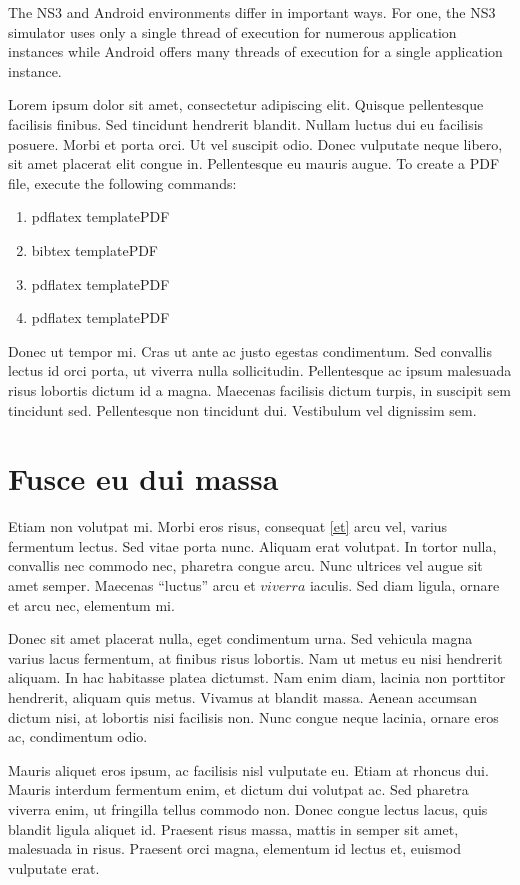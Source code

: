 \documentclass[10pt,twocolumn]{article}
\begin{document}
The NS3 and Android environments differ in important ways. For one, the NS3 simulator uses only a single thread of execution for numerous application instances while Android offers many threads of execution for a single application instance. 


Lorem ipsum dolor sit amet, consectetur adipiscing elit. Quisque pellentesque facilisis finibus. Sed tincidunt hendrerit blandit. Nullam luctus dui eu facilisis posuere. Morbi et porta orci. Ut vel suscipit odio. Donec vulputate neque libero, sit amet placerat elit congue in. Pellentesque eu mauris augue.
\noindent
To create a PDF file, execute the following commands:
\begin{enumerate}
\item pdflatex templatePDF
\item bibtex templatePDF
\item pdflatex templatePDF
\item pdflatex templatePDF
\end{enumerate}
\noindent
Donec ut tempor mi. Cras ut ante ac justo egestas condimentum. Sed convallis lectus id orci porta, ut viverra nulla sollicitudin. Pellentesque ac ipsum malesuada risus lobortis dictum id a magna. Maecenas facilisis dictum turpis, in suscipit sem tincidunt sed. Pellentesque non tincidunt dui. Vestibulum vel dignissim sem.

\section{Fusce eu dui massa}

Etiam non volutpat mi. Morbi eros risus, consequat \ref{et} arcu vel, varius fermentum lectus. Sed vitae porta nunc. Aliquam erat volutpat. In tortor nulla, convallis nec commodo nec, pharetra congue arcu. Nunc ultrices vel augue sit amet semper. Maecenas ``luctus'' arcu et $viverra$ iaculis. Sed diam ligula, ornare et arcu nec, elementum \cite{convallis} mi.

Donec sit amet placerat nulla, eget condimentum urna. Sed vehicula magna varius lacus fermentum, at finibus risus lobortis. Nam ut metus eu nisi hendrerit aliquam. In hac habitasse platea dictumst. Nam enim diam, lacinia non porttitor hendrerit, aliquam quis metus. Vivamus at blandit massa. Aenean accumsan dictum nisi, at lobortis nisi facilisis non. Nunc congue neque lacinia, ornare eros ac, condimentum odio.

Mauris aliquet eros ipsum, ac facilisis nisl vulputate eu. Etiam at rhoncus dui. Mauris interdum fermentum enim, et dictum dui volutpat ac. Sed pharetra viverra enim, ut fringilla tellus commodo non. Donec congue lectus lacus, quis blandit ligula aliquet id. Praesent risus massa, mattis in semper sit amet, malesuada in risus. Praesent orci magna, elementum id lectus et, euismod vulputate erat.
\end{document}
